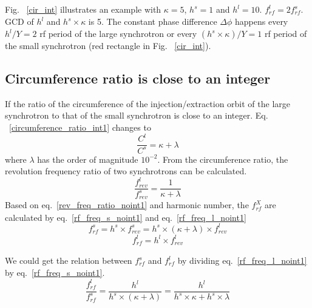 Fig. ~\ref{cir_int} illustrates an example with $\kappa=5$, $h^s=1$ and $h^l=10$. $f_{\mathit{rf}}^{l}=2f_{\mathit{rf}}^{s}$. GCD of $h^l$ and $h^s \times \kappa$ is 5. The constant phase difference $\Delta\phi$ happens every ${h^l/Y}=2$ rf period of the large synchrotron or every ${(h^s\times \kappa)/Y}=1$ rf period of the small synchrotron (red rectangle in Fig. ~\ref{cir_int}). 

\subsection{Circumference ratio is close to an integer}
If the ratio of the circumference of the injection/extraction orbit of the large synchrotron to that of the small synchrotron is close to an integer. Eq. ~\ref{circumference_ratio_int1} changes to 
\begin{equation}
\frac{C^l}{C^s}= \kappa + \lambda \label{circumference_ratio_noint11}
\end{equation}
where $\lambda$ has the order of magnitude $10^{-2}$. From the circumference ratio, the revolution frequency ratio of two synchrotrons can be calculated.
\begin{equation}
\frac{f_{\mathit{rev}}^{l}}{f_{\mathit{rev}}^{s}}=\frac{1}{ \kappa+ \lambda} \label{rev_freq_ratio_noint1}
\end{equation}
Based on eq.~\ref{rev_freq_ratio_noint1} and harmonic number, the $f_{\mathit{rf}}^{X}$ are calculated by eq.~\ref{rf_freq_s_noint1} and eq.~\ref{rf_freq_l_noint1}
\begin{equation} 
f_{\mathit{rf}}^{s}= h^s \times f_{\mathit{rev}}^{s}=h^s \times ( \kappa+ \lambda) \times f_{\mathit{rev}}^{l} \label{rf_freq_s_noint1}
\end{equation}
\begin{equation} 
f_{\mathit{rf}}^{l}= h^l \times f_{\mathit{rev}}^{l} \label{rf_freq_l_noint1}
\end{equation}

We could get the relation between $f_{\mathit{rf}}^{s}$ and $f_{\mathit{rf}}^{l}$ by dividing eq.~\ref{rf_freq_l_noint1} by eq.~\ref{rf_freq_s_noint1}.
\begin{equation} 
\frac{f_{\mathit{rf}}^{l}}{f_{\mathit{rf}}^{s}}=\frac{h^l}{h^s \times ( \kappa+ \lambda)}=\frac{h^l}{h^s \times  \kappa+ h^s \times \lambda}\label{close_to_interger_31}
\end{equation}

